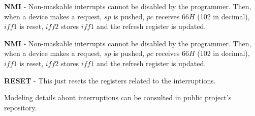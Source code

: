 \documentclass[a4paper]{llncs}
\begin{document}
\textbf{NMI} - Non-maskable interrupts cannot be disabled
 by the programmer. Then, when a device makes a request, $sp$ is pushed,
 $pc$ receives $66H$ (102 in decimal), $\textit{iff1}$ is reset, $\textit{iff2}$ stores
 $\textit{iff1}$ and the refresh register is updated.
  

 \textbf{NMI} - Non-maskable interrupts cannot be disabled
 by the programmer. Then, when a device makes a request, $sp$ is pushed,
 $pc$ receives $66H$ (102 in decimal), $\textit{iff1}$ is reset, $\textit{iff2}$ stores
 $\textit{iff1}$ and the refresh register is updated.

\textbf{RESET}  - This just resets the registers related to the interruptions.

Modeling details about interruptions can be consulted in
public project's repository.
\end{document}
